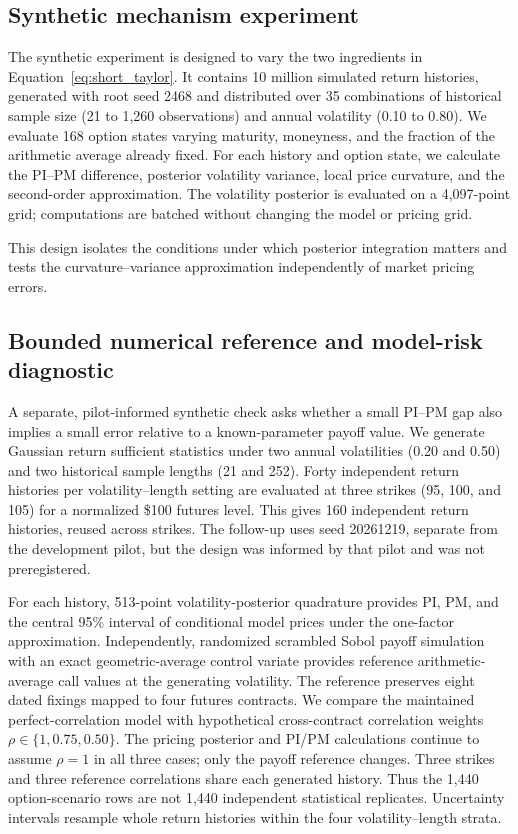 \subsection{Synthetic mechanism experiment}

The synthetic experiment is designed to vary the two ingredients in Equation~\eqref{eq:short_taylor}. It contains 10 million simulated return histories, generated with root seed 2468 and distributed over 35 combinations of historical sample size (21 to 1,260 observations) and annual volatility (0.10 to 0.80). We evaluate 168 option states varying maturity, moneyness, and the fraction of the arithmetic average already fixed. For each history and option state, we calculate the PI--PM difference, posterior volatility variance, local price curvature, and the second-order approximation. The volatility posterior is evaluated on a 4,097-point grid; computations are batched without changing the model or pricing grid.

This design isolates the conditions under which posterior integration matters and tests the curvature--variance approximation independently of market pricing errors.

\subsection{Bounded numerical reference and model-risk diagnostic}

A separate, pilot-informed synthetic check asks whether a small PI--PM gap
also implies a small error relative to a known-parameter payoff value.
We generate Gaussian return sufficient statistics under two annual volatilities
(0.20 and 0.50) and two historical sample lengths (21 and 252). Forty
independent return histories per volatility--length setting are evaluated at
three strikes (95, 100, and 105) for a normalized \$100 futures level.
This gives 160 independent return histories, reused across strikes.
The follow-up uses seed 20261219, separate from the development pilot,
but the design was informed by that pilot and was not preregistered.

For each history, 513-point volatility-posterior quadrature provides PI, PM,
and the central 95\% interval of conditional model prices under the
one-factor approximation. Independently, randomized scrambled Sobol
payoff simulation with an exact geometric-average control variate provides
reference arithmetic-average call values at the generating volatility.
The reference preserves eight dated fixings mapped to four futures contracts.
We compare the maintained perfect-correlation model with hypothetical
cross-contract correlation weights $\rho\in\{1,0.75,0.50\}$. The pricing
posterior and PI/PM calculations continue to assume $\rho=1$ in all three
cases; only the payoff reference changes. Three strikes and three reference
correlations share each generated history. Thus the 1,440 option-scenario
rows are not 1,440 independent statistical replicates. Uncertainty intervals
resample whole return histories within the four volatility--length strata.


